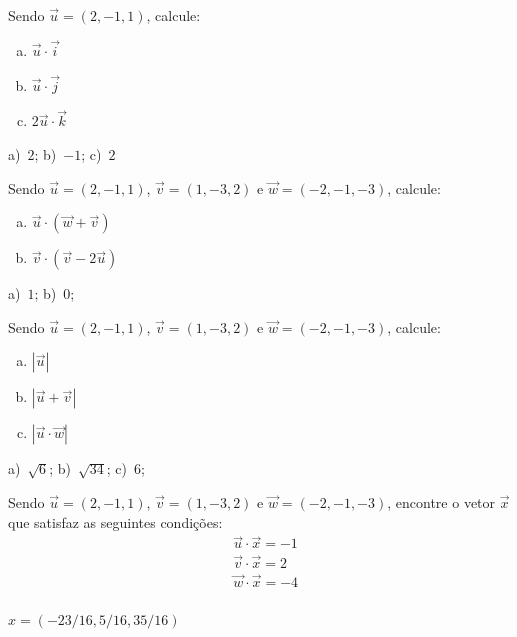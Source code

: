 \begin{exer}
  Sendo $\vec{u}=(2,-1,1)$, calcule:
  \begin{enumerate}[a)]
  \item $\vec{u}\cdot\vec{i}$
  \item $\vec{u}\cdot\vec{j}$
  \item $2\vec{u}\cdot\vec{k}$
  \end{enumerate}
\end{exer}
\begin{resp}
  a)~$2$; b)~$-1$; c)~$2$
\end{resp}

\begin{exer}
  Sendo $\vec{u}=(2,-1,1)$, $\vec{v}=(1,-3,2)$ e $\vec{w}=(-2,-1,-3)$, calcule:
  \begin{enumerate}[a)]
  \item $\vec{u}\cdot(\vec{w}+\vec{v})$
  \item $\vec{v}\cdot(\vec{v}-2\vec{u})$
  \end{enumerate}
\end{exer}
\begin{resp}
  a)~$1$; b)~$0$;
\end{resp}

\begin{exer}
  Sendo $\vec{u}=(2,-1,1)$, $\vec{v}=(1,-3,2)$ e $\vec{w}=(-2,-1,-3)$, calcule:
  \begin{enumerate}[a)]
  \item $|\vec{u}|$
  \item $|\vec{u}+\vec{v}|$
  \item $|\vec{u}\cdot\vec{w}|$
  \end{enumerate}
\end{exer}
\begin{resp}
  a)~$\sqrt{6}$; b)~$\sqrt{34}$; c)~$6$;
\end{resp}

\begin{exer}
  Sendo $\vec{u}=(2,-1,1)$, $\vec{v}=(1,-3,2)$ e $\vec{w}=(-2,-1,-3)$, encontre o vetor $\vec{x}$ que satisfaz as seguintes condições:
  \begin{align}
    &\vec{u}\cdot\vec{x} = -1\\
    &\vec{v}\cdot\vec{x} = 2\\
    &\vec{w}\cdot\vec{x} = -4\\
  \end{align}
\end{exer}
\begin{resp}
  $x = (-23/16, 5/16, 35/16)$
\end{resp}

